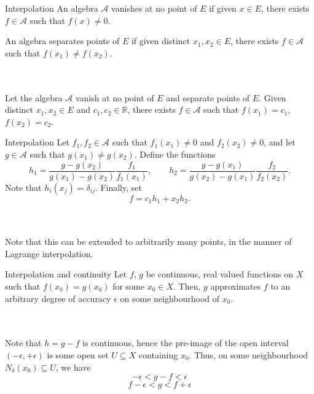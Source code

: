 \documentclass{beamer}
\def\R{\mathbb{R}}
\begin{document}
    \begin{frame}{Interpolation}
        An algebra $\mathscr{A}$ vanishes at no point of $E$ if given $x \in E$,
        there exists $f \in \mathscr{A}$ such that $f(x) \neq 0$.

        An algebra separates points of $E$ if given distinct $x_1, x_2 \in E$, there
        exists $f \in \mathscr{A}$ such that $f(x_1) \neq f(x_2)$.

        \\~\\

        Let the algebra $\mathscr{A}$ vanish at no point of $E$ and separate
        points of $E$. Given distinct $x_1, x_2 \in E$ and $c_1, c_2 \in \R$, there
        exists $f \in \mathscr{A}$ such that $f(x_1) = c_1$, $f(x_2) = c_2$.
    \end{frame}

    \begin{frame}{Interpolation}
        Let $f_1, f_2 \in \mathscr{A}$ such that $f_1(x_1) \neq 0$ and $f_2(x_2) \neq
        0$, and let $g \in \mathscr{A}$ such that $g(x_1) \neq g(x_2)$. Define the
        functions \[
            h_1 = \frac{g - g(x_2)}{g(x_1) - g(x_2)} \frac{f_1}{f_1(x_1)}, \qquad
            h_2 = \frac{g - g(x_1)}{g(x_2) - g(x_1)} \frac{f_2}{f_2(x_2)}.
        \] Note that $h_i(x_j) = \delta_{ij}$. Finally, set \[
            f = c_1 h_1 + x_2 h_2. \tag*{\qed}
        \] 

        \\~\\

        Note that this can be extended to arbitrarily many points, in the manner of
        Lagrange interpolation.
    \end{frame}
    
    \begin{frame}{Interpolation and continuity}
        Let $f$, $g$ be continuous, real valued functions on $X$ such that $f(x_0) =
        g(x_0)$ for some $x_0 \in X$. Then, $g$ approximates $f$ to an arbitrary
        degree of accuracy $\epsilon$ on some neighbourhood of $x_0$.

        \\~\\

        Note that $h = g - f$ is continuous, hence the pre-image of the open interval
        $(-\epsilon, +\epsilon)$ is some open set $U \subseteq X$ containing
        $x_0$. Thus, on some neighbourhood $N_\delta(x_0) \subseteq U$, we have \[
            -\epsilon < g - f < \epsilon
        \] \[
            f - \epsilon < g < f + \epsilon \tag*{\qed}
        \] 
    \end{frame}
\end{document}
